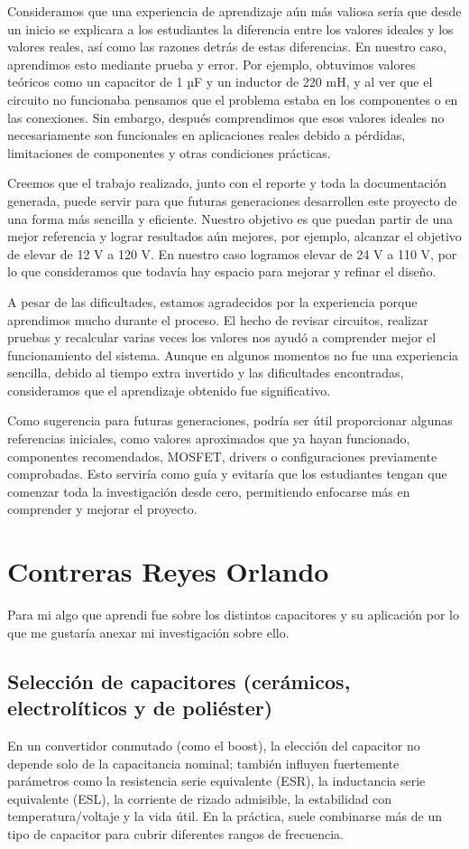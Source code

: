 \documentclass[12pt,a4paper]{article}
\begin{document}
Consideramos que una experiencia de aprendizaje aún más valiosa sería que desde un inicio se explicara a los estudiantes la diferencia entre los valores ideales y los valores reales, así como las razones detrás de estas diferencias. En nuestro caso, aprendimos esto mediante prueba y error. Por ejemplo, obtuvimos valores teóricos como un capacitor de 1 µF y un inductor de 220 mH, y al ver que el circuito no funcionaba pensamos que el problema estaba en los componentes o en las conexiones. Sin embargo, después comprendimos que esos valores ideales no necesariamente son funcionales en aplicaciones reales debido a pérdidas, limitaciones de componentes y otras condiciones prácticas.

Creemos que el trabajo realizado, junto con el reporte y toda la documentación generada, puede servir para que futuras generaciones desarrollen este proyecto de una forma más sencilla y eficiente. Nuestro objetivo es que puedan partir de una mejor referencia y lograr resultados aún mejores, por ejemplo, alcanzar el objetivo de elevar de 12 V a 120 V. En nuestro caso logramos elevar de 24 V a 110 V, por lo que consideramos que todavía hay espacio para mejorar y refinar el diseño.

A pesar de las dificultades, estamos agradecidos por la experiencia porque aprendimos mucho durante el proceso. El hecho de revisar circuitos, realizar pruebas y recalcular varias veces los valores nos ayudó a comprender mejor el funcionamiento del sistema. Aunque en algunos momentos no fue una experiencia sencilla, debido al tiempo extra invertido y las dificultades encontradas, consideramos que el aprendizaje obtenido fue significativo.

Como sugerencia para futuras generaciones, podría ser útil proporcionar algunas referencias iniciales, como valores aproximados que ya hayan funcionado, componentes recomendados, MOSFET, drivers o configuraciones previamente comprobadas. Esto serviría como guía y evitaría que los estudiantes tengan que comenzar toda la investigación desde cero, permitiendo enfocarse más en comprender y mejorar el proyecto.
\newpage
\section{Contreras Reyes Orlando}
Para mi algo  que aprendi fue sobre los distintos capacitores y su aplicación por lo que me gustaría anexar mi investigación sobre ello.
\subsection*{Selección de capacitores (cerámicos, electrolíticos y de poliéster)}
En un convertidor conmutado (como el boost), la elección del capacitor no depende solo de la capacitancia nominal; también influyen fuertemente parámetros como la resistencia serie equivalente (ESR), la inductancia serie equivalente (ESL), la corriente de rizado admisible, la estabilidad con temperatura/voltaje y la vida útil. En la práctica, suele combinarse más de un tipo de capacitor para cubrir diferentes rangos de frecuencia.
\end{document}
